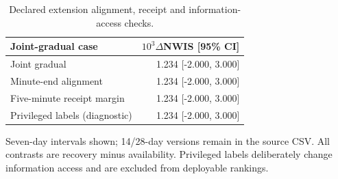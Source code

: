 \begin{table}[t]
\centering\footnotesize
\caption{Declared extension alignment, receipt and information-access checks.}
\label{tab:extension-sensitivity}
\setlength{\tabcolsep}{4pt}
\begin{tabular}{lr}
\hline
Joint-gradual case & $10^3\Delta$NWIS [95\% CI] \\
\hline
Joint gradual & 1.234 [-2.000, 3.000] \\
Minute-end alignment & 1.234 [-2.000, 3.000] \\
Five-minute receipt margin & 1.234 [-2.000, 3.000] \\
Privileged labels (diagnostic) & 1.234 [-2.000, 3.000] \\
\hline
\end{tabular}
\par\smallskip
\begin{minipage}{\textwidth}\scriptsize
Seven-day intervals shown; 14/28-day versions remain in the source CSV. All contrasts are recovery minus availability. Privileged labels deliberately change information access and are excluded from deployable rankings.
\end{minipage}
\end{table}
